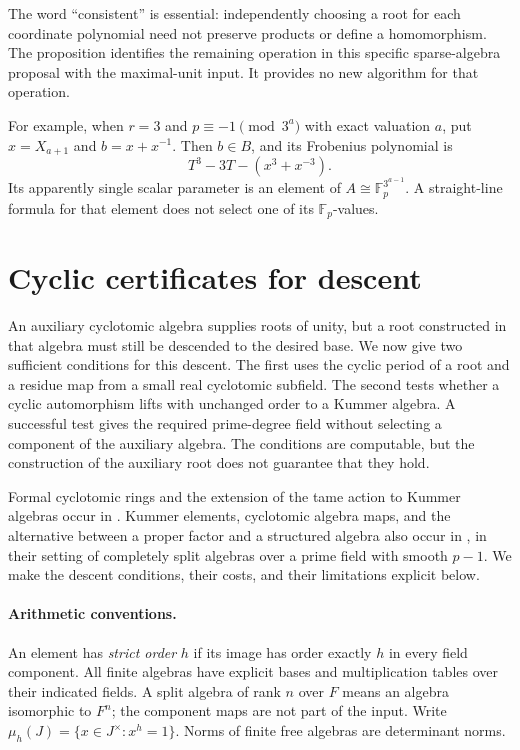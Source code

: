 \documentclass[11pt]{article}
\theoremstyle{definition}
\theoremstyle{remark}
\begin{document}
The word ``consistent'' is essential: independently choosing
a root for each coordinate polynomial need not preserve
products or define a homomorphism. The proposition identifies
the remaining operation in this specific sparse-algebra
proposal with the maximal-unit input. It provides no new
algorithm for that operation.

For example, when \(r=3\) and \(p\equiv-1\pmod{3^a}\)
with exact valuation \(a\), put \(x=X_{a+1}\) and
\(b=x+x^{-1}\). Then \(b\in B\), and its Frobenius
polynomial is
\[
               T^3-3T-(x^3+x^{-3}).
\]
Its apparently single scalar parameter is an
element of \(A\cong\mathbb F_p^{3^{a-1}}\).
A straight-line formula for that element does not select
one of its \(\mathbb F_p\)-values.


\section{Cyclic certificates for descent}
\label{sec:cyclic-descent-certificates}

An auxiliary cyclotomic algebra supplies roots of unity, but a root
constructed in that algebra must still be descended to the desired base.
We now give two sufficient conditions for this descent.  The first uses
the cyclic period of a root and a residue map from a small real
cyclotomic subfield.  The second tests whether a cyclic automorphism
lifts with unchanged order to a Kummer algebra.  A successful test gives
the required prime-degree field without selecting a component of the
auxiliary algebra.  The conditions are computable, but the construction
of the auxiliary root does not guarantee that they hold.

Formal cyclotomic rings and the extension of the tame action to Kummer
algebras occur in \citet[Proposition~(4.3), printed p.~337;
Theorems~(5.1)--(5.2), pp.~338--340]{Lenstra1991}.
Kummer elements, cyclotomic algebra maps, and the alternative between a
proper factor and a structured algebra also occur in
\citet[Lemmas~6.1--6.2, author pp.~30--31;
Theorem~6.3, author p.~32]{IKRS2012}, in their setting of completely
split algebras over a prime field with smooth \(p-1\).
We make the descent conditions, their costs, and their limitations
explicit below.

\paragraph{Arithmetic conventions.}
An element has \emph{strict order} \(h\) if its image has order exactly
\(h\) in every field component.  All finite algebras have explicit bases
and multiplication tables over their indicated fields.  A split algebra
of rank \(n\) over \(F\) means an algebra isomorphic to \(F^n\);
the component maps are not part of the input.
Write \(\mu_h(J)=\{x\in J^\times:x^h=1\}\).
Norms of finite free algebras are determinant norms.
\end{document}
